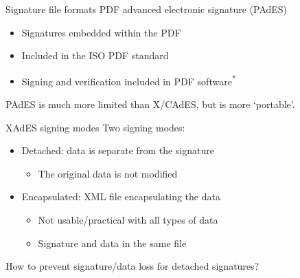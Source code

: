 \begin{frame}{Signature file formats}
  PDF advanced electronic signature (PAdES)
  \begin{itemize}[<+(1)->]
    \item Signatures embedded within the PDF
    \item Included in the ISO PDF standard
    \item Signing and verification included in PDF software\textsuperscript{*}
  \end{itemize}

  \vspace*{1em}

  \pause
  PAdES is much more limited than X/CAdES, but is more `portable'.
\end{frame}

\begin{frame}{XAdES signing modes}
  Two signing modes:
  \begin{itemize}[<+(1)->]
    \item Detached: data is separate from the signature
    \begin{itemize}
      \item The original data is not modified
    \end{itemize}
    \item Encapsulated: XML file encapsulating the data
    \begin{itemize}
      \item Not usable/practical with all types of data
      \item Signature and data in the same file
    \end{itemize}
  \end{itemize}

  \vspace*{1em}

  \pause
  How to prevent signature/data loss for detached signatures?
\end{frame}

